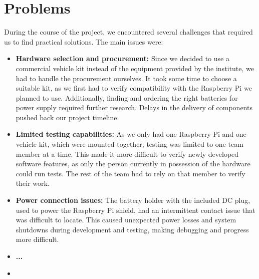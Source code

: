 \section{Problems}


During the course of the project, we encountered several challenges that required us to find practical solutions. The main issues were:

\begin{itemize}
    \item \textbf{Hardware selection and procurement:}
    Since we decided to use a commercial vehicle kit instead of the equipment provided by the institute, we had to handle the procurement ourselves. It took some time to choose a suitable kit, as we first had to verify compatibility with the Raspberry Pi we planned to use. Additionally, finding and ordering the right batteries for power supply required further research. Delays in the delivery of components pushed back our project timeline.

    \item \textbf{Limited testing capabilities:}
    As we only had one Raspberry Pi and one vehicle kit, which were mounted together, testing was limited to one team member at a time. This made it more difficult to verify newly developed software features, as only the person currently in possession of the hardware could run tests. The rest of the team had to rely on that member to verify their work.

    \item \textbf{Power connection issues:}
    The battery holder with the included DC plug, used to power the Raspberry Pi shield, had an intermittent contact issue that was difficult to locate. This caused unexpected power losses and system shutdowns during development and testing, making debugging and progress more difficult.
    \item \textbf{...}
\item \end{itemize}